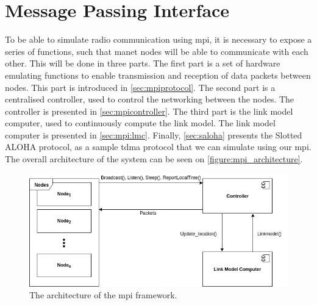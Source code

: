 \chapter{Message Passing Interface}

To be able to simulate radio communication using \gls{mpi}, it is necessary to expose a series of functions, such that \gls{manet} nodes will be able to communicate with each other. This will be done in three parts. The first part is a set of hardware emulating functions to enable transmission and reception of data packets between nodes. This part is introduced in \autoref{sec:mpiprotocol}. The second part is a centralised controller, used to control the networking between the nodes. The controller is presented in \autoref{sec:mpicontroller}. The third part is the link model computer, used to continuously compute the link model. The link model computer is presented in \autoref{sec:mpi:lmc}. Finally, \autoref{sec:saloha} presents the Slotted ALOHA protocol, as a sample \gls{tdma} protocol that we can simulate using our \gls{mpi}. The overall architecture of the system can be seen on \autoref{figure:mpi_architecture}.

\begin{figure}[ht]
    \centering
    \includegraphics[width=\textwidth]{figures/mpi_architecture.png}
    \caption{The architecture of the \gls{mpi} framework.}
    \label{figure:mpi_architecture}
\end{figure}







